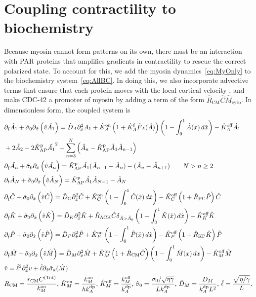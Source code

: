 \documentclass[11pt]{article}
\newcommand{\6}[1]{#1_{\text{6}}}
\newcommand{\3}[1]{#1_{\text{3}}}
\newcommand{\Tot}[1]{#1^\text{(Tot)}}
\newcommand{\My}[1]{#1_M}
\begin{document}
\section{Coupling contractility to biochemistry \label{sec:WithMy}}
Because myosin cannot form patterns on its own, there must be an interaction with PAR proteins that amplifies gradients in contractility to rescue the correct polarized state. To account for this, we add the myosin dynamics\ \eqref{eq:MyOnly} to the biochemistry system\ \eqref{eq:AllBC}. In doing this, we also incorporate advective terms that ensure that each protein moves with the local cortical velocity \cite{illukkumbura2023design}, and make CDC-42 a promoter of myosin by adding a term of the form $\hat R_\text{CM} \hat C \hat{M}_\text{cyto}$. In dimensionless form, the coupled system is 
\begin{subequations}
\label{eq:Everything}
\begin{align}
& \Dthat \hat{\MA} +\hat{\sigma}_0  \Dxhat \left(\hat{v} \hat{\MA} \right)  = \DhatA \Dxhat^2 \MA +\KhatonA \left(1+\KhatfA \hat F_A(\hat A) \right)\left(1 - \int_0^1 \hat A(x) \, d\hat{x} \right)- \KhatoffA \hat{\MA} \\ \nonumber
 &+ 2 \hat{A}_2-2\KhatpAP \hat{\MA}^2+\sum_{n=3}^N \left(\hat A_n-\KhatpAP \hat A_1 \hat A_{n-1}\right)  \\
&\Dthat \hat{\PA} +\hat{\sigma}_0  \Dxhat \left(\hat{v} \hat{\PA} \right) =\KhatpAP \hat{\MA} (\hat A_{n-1}-\hat A_n) - (\hat A_n-\hat A_{n+1})  \qquad N > n \geq 2 \\ 
& \Dt \hat A_N +\hat{\sigma}_0  \Dxhat \left(\hat{v} \hat A_N \right)  =\KhatpAP \hat \MA \hat A_{N-1}- \hat A_N \\ 
&\Dthat \hat{C}+\hat{\sigma}_0  \Dxhat \left(\hat{v} \hat{C} \right)  =\DhatC \Dxhat^2 \hat{C} +\KhatonC \left(1 - \int_0^1 \hat{C}(\hat x) \, d\hat{x} \right)  - \KhatoffC \left(1+\hat{R}_\text{PC}\hat P\right)\hat{C}\\
&\Dthat \hat{K} +\hat{\sigma}_0  \Dxhat \left(\hat{v} \hat{K} \right) = \DhatK \Dxhat^2 \hat{K} + \hat{R}_\text{ACK} \hat{C} \delta_{\hat A > \hat A_0} \left(1 - \int_0^1 \hat{K}(\hat x) \, d\hat{x} \right)-\KhatoffK \hat{K} \\
&\Dthat \hat{P} +\hat{\sigma}_0  \Dxhat \left(\hat{v} \hat{P} \right)  =\DhatP \Dxhat^2 \hat{P} +\KhatonP \left(1 - \int_0^1 \hat{P}(\hat x) \, d\hat{x} \right)  - \KhatoffP \left(1+\hat{R}_\text{KP}\hat{K}\right)\hat{P}\\
&\Dthat \hat{M} +\hat{\sigma}_0  \Dxhat \left(\hat{v} \hat{M} \right) =\hat{D}_M \Dxhat^2 \hat{M} +\KhatonM \left(1+\hat{R}_\text{CM} \hat C\right) \left(1-\int_0^1  \hat{M}(x) \, dx\right)- \KhatoffM \hat{M}\\
&\hat{v} = \hat{\ell}^2 \Dxhat^2 v +\hat{\ell} \Dxhat \hat{\sigma}_a(\hat{M})\\
\label{eq:NewNDs}
&R_\text{CM}=\frac{r_\text{CM}\Tot{C}}{\kon_M},\, \hat{K}^\text{on}_M= \frac{\My{\kon}}{h \kdp_A}, \, \hat{K}^\text{off}_M= \frac{\My{\koff}}{\kdp_A},\, \hat{\sigma}_0 = \frac{\sigma_0/ \sqrt{\eta \gamma} }{L \kdp_A},   \, \hat{D}_M =\frac{D_M}{\kdp_A L^2}, \, \hat{\ell} = \frac{\sqrt{\eta/\gamma}}{L}.
\end{align}
\end{subequations}
\end{document}
